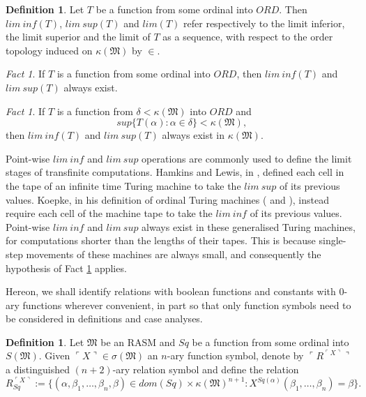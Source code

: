 \documentclass[12pt, twoside]{memoir}
\numberwithin{equation}{section}
\theoremstyle{definition}
\newtheorem{defi}[thm]{Definition}
\theoremstyle{remark}
\newtheorem{fact}[thm]{Fact}
\theoremstyle{definition}
\theoremstyle{definition}
\theoremstyle{definition}
\theoremstyle{remark}
\begin{document}
\begin{defi}
Let $T$ be a function from some ordinal into $ORD$. Then $lim \ inf (T)$, $lim \ sup (T)$ and $lim(T)$ refer respectively to the limit inferior, the limit superior and the limit of $T$ as a sequence, with respect to the order topology induced on $\kappa(\mathfrak{M})$ by $\in$.
\end{defi}

\begin{fact}
If $T$ is a function from some ordinal into $ORD$, then $lim \ inf (T)$ and $lim \ sup (T)$ always exist.
\end{fact}

\begin{fact}\label{fact230}
If $T$ is a function from $\delta < \kappa(\mathfrak{M})$ into $ORD$ and
\begin{equation*}
    sup \{T(\alpha) : \alpha \in \delta\} < \kappa(\mathfrak{M}) \text{,}
\end{equation*}
then $lim \ inf (T)$ and $lim \ sup (T)$ always exist in $\kappa(\mathfrak{M})$.
\end{fact}

Point-wise $lim \ inf$ and $lim \ sup$ operations are commonly used to define the limit stages of transfinite computations. Hamkins and Lewis, in \cite{ittm}, defined each cell in the tape of an infinite time Turing machine to take the $lim \ sup$ of its previous values. Koepke, in his definition of ordinal Turing machines (\cite{koepke1} and \cite{koepke2}), instead require each cell of the machine tape to take the $lim \ inf$ of its previous values. Point-wise $lim \ inf$ and $lim \ sup$ always exist in these generalised Turing machines, for computations shorter than the lengths of their tapes. This is because single-step movements of these machines are always small, and consequently the hypothesis of Fact \ref{fact230} applies.

Hereon, we shall identify relations with boolean functions and constants with $0$-ary functions wherever convenient, in part so that only function symbols need to be considered in definitions and case analyses. 

\begin{defi}
Let $\mathfrak{M}$ be an RASM and $Sq$ be a function from some ordinal into $S(\mathfrak{M})$. Given $\ulcorner X \urcorner \in \sigma(\mathfrak{M})$ an $n$-ary function symbol, denote by $\ulcorner R^{\ulcorner X \urcorner} \urcorner$ a distinguished $(n+2)$-ary relation symbol and define the relation 
\begin{equation*}
    R_{Sq}^{\ulcorner X \urcorner} := \{(\alpha, \beta_1, \dots, \beta_n, \beta) \in dom(Sq) \times \kappa(\mathfrak{M})^{n+1} : X^{Sq(\alpha)} (\beta_1, \dots, \beta_n) = \beta\} \text{.}
\end{equation*}
\end{defi}
\end{document}
